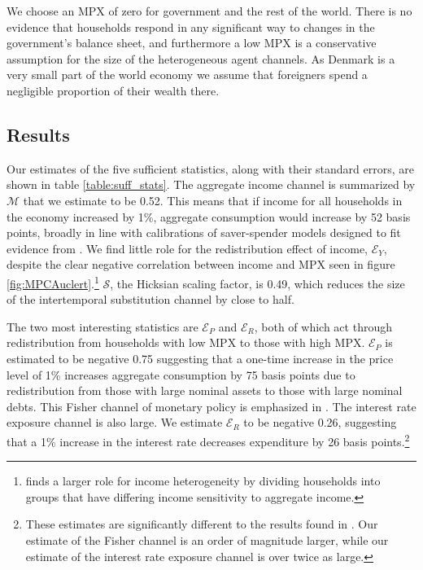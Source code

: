 \documentclass[titlepage]{\econtex}\newcommand{\texname}{ConsumptionHeterogeneity}
\begin{document}
We choose an MPX of zero for government and the rest of the world. There is no evidence that households respond in any significant way to changes in the government's balance sheet, and furthermore a low MPX is a conservative assumption for the size of the heterogeneous agent channels. As Denmark is a very small part of the world economy we assume that foreigners spend a negligible proportion of their wealth there.

\subsection{Results}
Our estimates of the five sufficient statistics, along with their standard errors, are shown in table \ref{table:suff_stats}. The aggregate income channel is summarized by $\mathcal{M}$ that we estimate to be 0.52. This means that if income for all households in the economy increased by 1\%, aggregate consumption would increase by 52 basis points, broadly in line with calibrations of saver-spender models designed to fit evidence from \cite{campbell_consumption_1989}. We find little role for the redistribution effect of income, $\mathcal{E}_Y$, despite the clear negative correlation between income and MPX seen in figure \ref{fig:MPCAuclert}.\footnote{\cite{patterson_2019} finds a larger role for income heterogeneity by dividing households into groups that have differing income sensitivity to aggregate income.} $\mathcal{S}$, the Hicksian scaling factor, is 0.49, which reduces the size of the intertemporal substitution channel by close to half.

The two most interesting statistics are $\mathcal{E}_P$ and $\mathcal{E}_R$, both of which act through redistribution from households with low MPX to those with high MPX. $\mathcal{E}_P$ is estimated to be  negative 0.75 suggesting that a one-time increase in the price level of 1\% increases aggregate consumption by 75 basis points due to redistribution from those with large nominal assets to those with large nominal debts. This Fisher channel of monetary policy is emphasized in \cite{doepke_inflation_2006}. The interest rate exposure channel is also large. We estimate  $\mathcal{E}_R$ to be  negative 0.26, suggesting that a 1\% increase in the interest rate decreases expenditure by 26 basis points.\footnote{These estimates are significantly different to the results found in \cite{auclert_monetary_2017}. Our estimate of the Fisher channel is an order of magnitude larger, while our estimate of the interest rate exposure channel is over twice as large.}
\end{document}
